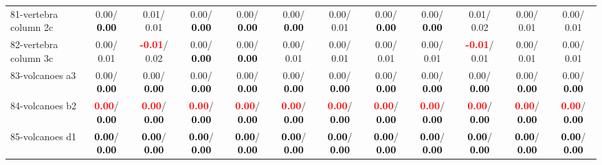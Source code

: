 \begin{table}[h]
\begin{center}
{\begin{tabular}{lc|c|c|c|c|c|c|c|c|c|c}
81-vertebra column 2c &   0.00/\textcolor{black}{\textbf{  0.00}} &   0.01/  0.01 &   0.00/\textcolor{black}{\textbf{  0.00}} &   0.00/\textcolor{black}{\textbf{  0.00}} &   0.00/\textcolor{black}{\textbf{  0.00}} &   0.00/  0.01 &   0.00/\textcolor{black}{\textbf{  0.00}} &   0.00/\textcolor{black}{\textbf{  0.00}} &   0.01/  0.02 &   0.00/  0.01 &   0.00/  0.01 \\
82-vertebra column 3c &   0.00/  0.01 & \textcolor{red}{\textbf{ -0.01}}/  0.02 &   0.00/\textcolor{black}{\textbf{  0.00}} &   0.00/\textcolor{black}{\textbf{  0.00}} &   0.00/  0.01 &   0.00/  0.01 &   0.00/  0.01 &   0.00/  0.01 & \textcolor{red}{\textbf{ -0.01}}/  0.01 &   0.00/  0.01 &   0.00/  0.01 \\
83-volcanoes a3 &   0.00/\textcolor{black}{\textbf{  0.00}} &   0.00/\textcolor{black}{\textbf{  0.00}} &   0.00/\textcolor{black}{\textbf{  0.00}} &   0.00/\textcolor{black}{\textbf{  0.00}} &   0.00/\textcolor{black}{\textbf{  0.00}} &   0.00/\textcolor{black}{\textbf{  0.00}} &   0.00/\textcolor{black}{\textbf{  0.00}} &   0.00/\textcolor{black}{\textbf{  0.00}} &   0.00/\textcolor{black}{\textbf{  0.00}} &   0.00/\textcolor{black}{\textbf{  0.00}} &   0.00/\textcolor{black}{\textbf{  0.00}} \\
84-volcanoes b2 & \textcolor{red}{\textbf{  0.00}}/\textcolor{black}{\textbf{  0.00}} & \textcolor{red}{\textbf{  0.00}}/\textcolor{black}{\textbf{  0.00}} & \textcolor{red}{\textbf{  0.00}}/\textcolor{black}{\textbf{  0.00}} & \textcolor{red}{\textbf{  0.00}}/\textcolor{black}{\textbf{  0.00}} & \textcolor{red}{\textbf{  0.00}}/\textcolor{black}{\textbf{  0.00}} & \textcolor{red}{\textbf{  0.00}}/\textcolor{black}{\textbf{  0.00}} & \textcolor{red}{\textbf{  0.00}}/\textcolor{black}{\textbf{  0.00}} & \textcolor{red}{\textbf{  0.00}}/\textcolor{black}{\textbf{  0.00}} & \textcolor{red}{\textbf{  0.00}}/\textcolor{black}{\textbf{  0.00}} & \textcolor{red}{\textbf{  0.00}}/\textcolor{black}{\textbf{  0.00}} & \textcolor{red}{\textbf{  0.00}}/\textcolor{black}{\textbf{  0.00}} \\
85-volcanoes d1 & \textcolor{black}{\textbf{  0.00}}/\textcolor{black}{\textbf{  0.00}} & \textcolor{black}{\textbf{  0.00}}/\textcolor{black}{\textbf{  0.00}} & \textcolor{black}{\textbf{  0.00}}/\textcolor{black}{\textbf{  0.00}} & \textcolor{black}{\textbf{  0.00}}/\textcolor{black}{\textbf{  0.00}} & \textcolor{black}{\textbf{  0.00}}/\textcolor{black}{\textbf{  0.00}} & \textcolor{black}{\textbf{  0.00}}/\textcolor{black}{\textbf{  0.00}} & \textcolor{black}{\textbf{  0.00}}/\textcolor{black}{\textbf{  0.00}} & \textcolor{black}{\textbf{  0.00}}/\textcolor{black}{\textbf{  0.00}} & \textcolor{black}{\textbf{  0.00}}/\textcolor{black}{\textbf{  0.00}} & \textcolor{black}{\textbf{  0.00}}/\textcolor{black}{\textbf{  0.00}} & \textcolor{black}{\textbf{  0.00}}/\textcolor{black}{\textbf{  0.00}} \\ \hline

\end{tabular}}
\end{center}
\end{table}
